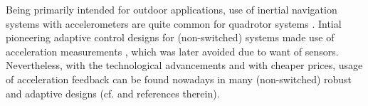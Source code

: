 \documentclass[AMA,STIX1COL,sort, compress]{WileyNJD-v2}
\begin{document}
\begin{remark}
	Being primarily intended for outdoor applications, use of inertial navigation
	systems with accelerometers are quite common for quadrotor systems \cite{ha2014passivity, lee2012experimental}. %
	Intial pioneering adaptive control designs for (non-switched) systems made use of acceleration measurements \cite{spong1990adaptive}, which was later avoided due to want of sensors. Nevertheless, with the technological advancements and with cheaper prices, usage of acceleration feedback can be found nowadays in many (non-switched) robust and adaptive designs (cf. \cite{roy2019, roy2017adaptive, roy2020adaptive, cst_new} and references therein). 
	

\end{remark}
\end{document}
